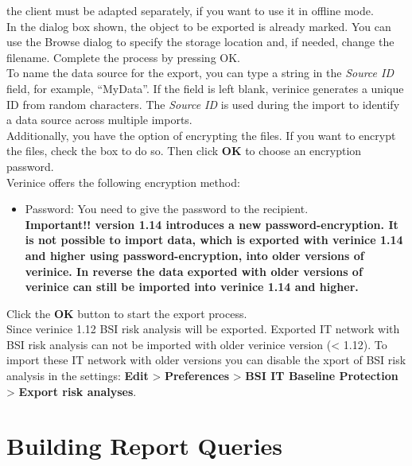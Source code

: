 \documentclass[a4paper,10pt]{book}
\begin{document}
the client must be adapted separately, if you want to use it in offline mode.
\newline\\
In the dialog box shown, the object to be exported is already marked. You can use the Browse dialog
to specify the storage location and, if needed, change the filename. Complete the process by pressing OK.
\newline\\
To name the data source for the export, you can type a string in the \textit{Source ID} field, for example,
``MyData''. If the field is left blank, verinice generates a unique ID from random characters. The \textit{Source ID}
is used during the import to identify a data source across multiple imports.
\newline\\
Additionally, you have the option of encrypting the files. If you want to encrypt the files, check the
box to do so. Then click \textbf{OK} to choose an encryption password.
\newline\\
Verinice offers the following encryption method:
\begin{itemize}
 \item Password: You need to give the password to the recipient.\\
 \textbf{Important!! version 1.14 introduces a new password-encryption. It is
 not possible to import data, which is exported with verinice 1.14 and higher
 using password-encryption, into older versions of verinice. In reverse the
 data exported with older versions of verinice can still be imported into
 verinice 1.14 and higher.}
\end{itemize}
Click the \textbf{OK} button to start the export process.
\newline\\
Since verinice 1.12 BSI risk analysis will be exported. Exported IT network with BSI risk analysis can not be imported with older verinice version (< 1.12).
To import these IT network with older versions you can disable the xport of BSI risk analysis in the
settings: \textbf{Edit} \textgreater \textbf{ Preferences} \textgreater \textbf{ BSI IT Baseline Protection} \textgreater \textbf{ Export risk analyses}.


\section{Building Report Queries}\label{building-report-queries}
\end{document}
